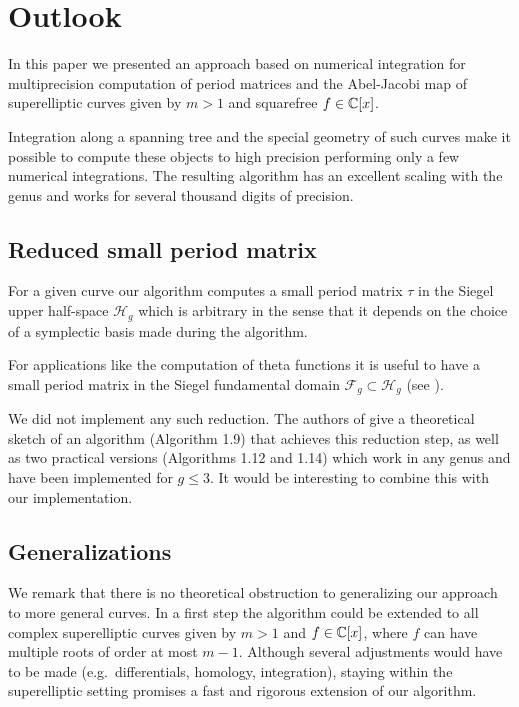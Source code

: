 \documentclass[main.tex]{subfiles}
\begin{document}
  \section{Outlook}\label{sec:outlook}

  In this paper we presented an approach based on numerical integration for
  multiprecision computation of period matrices and the Abel-Jacobi map of
  superelliptic curves given by $m > 1$ and squarefree $f \in \mathbb{C}[x]$.
 
  Integration along a spanning tree and the special geometry of such curves
  make it possible to compute these objects to high precision performing only
  a few numerical integrations. The resulting algorithm has an excellent
  scaling with the genus and works for several thousand digits of precision.

  \subsection{Reduced small period matrix}

   For a given curve our algorithm computes a small period matrix
   $\tau$ in the Siegel upper half-space $\mathcal{H}_g$ which is arbitrary
   in the sense that it depends on the choice of a symplectic basis made
   during the algorithm.
   
   For applications like the computation of theta functions it is useful to
   have a small period matrix in the Siegel fundamental domain $\mathcal{F}_g \subset
   \mathcal{H}_g$ (see \cite[\S 1.3]{PlaneQuarticsCM}).
  
   We did not implement any such reduction.
   The authors of \cite{PlaneQuarticsCM} give a theoretical sketch of
   an algorithm (Algorithm 1.9) that achieves this reduction step, as well as
   two practical versions (Algorithms 1.12 and 1.14) which work in any genus and have been implemented for $g
   \le 3$. It would be interesting to combine this with our implementation.
  
  \subsection{Generalizations}
  
  We remark that there is no theoretical obstruction to generalizing our
  approach to more general curves. In a first step the algorithm could be
  extended to all complex superelliptic curves given by $m > 1$ and $f \in
  \mathbb{C}[x]$, where $f$ can have multiple roots of order at most $m-1$.
  Although several adjustments would have to be made (e.g.\ differentials,
  homology, integration), staying within the superelliptic setting promises
  a fast and rigorous extension of our algorithm. 
  
\end{document}
